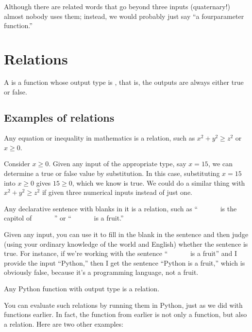 \documentclass[letterpaper,10pt,english]{sphinxmanual}
\begin{document}
Although there are related words that go beyond three inputs (quaternary!) almost nobody uses them; instead, we would probably just say “a four\sphinxhyphen{}parameter function.”


\section{Relations}
\label{\detokenize{chapter-2-mathematical-foundations:relations}}
 A  is a function whose output type is , that is, the outputs are always either true or false.


\subsection{Examples of relations}
\label{\detokenize{chapter-2-mathematical-foundations:examples-of-relations}}
 Any equation or inequality in mathematics is a relation, such as \(x^2+y^2\ge z^2\) or \(x\ge 0\).

Consider \(x\ge 0\).  Given any input of the appropriate type, say \(x=15\), we can determine a true or false value by substitution.  In this case, substituting \(x=15\) into \(x\ge0\) gives \(15\ge0\), which we know is true.  We could do a similar thing with \(x^2+y^2\ge z^2\) if given three numerical inputs instead of just one.

 Any declarative sentence with blanks in it is a relation, such as “        is the capitol of        ” or “        is a fruit.”

Given any input, you can use it to fill in the blank in the sentence and then judge (using your ordinary knowledge of the world and English) whether the sentence is true.  For instance, if we’re working with the sentence “        is a fruit” and I provide the input “Python,” then I get the sentence “Python is a fruit,” which is obviously false, because it’s a programming language, not a fruit.

 Any Python function with output type  is a relation.

You can evaluate such relations by running them in Python, just as we did with functions earlier.  In fact, the  function from earlier is not only a function, but also a relation.  Here are two other examples:
\end{document}
